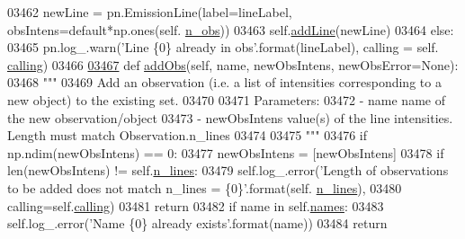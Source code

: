 \begin{DoxyCode}
{{{{{{{{{{{{{{{{{{{{{{03462             newLine = pn.EmissionLine(label=lineLabel, obsIntens=default*np.ones(self.
      \hyperlink{classpyneb_1_1core_1_1pynebcore_1_1_observation_aef2877f7f50f5c70cee1f0da97b34081}{n\_obs}))
03463             self.\hyperlink{classpyneb_1_1core_1_1pynebcore_1_1_observation_a5f4b01dbeb8d50963fb7fa21b94bfc17}{addLine}(newLine)
03464         \textcolor{keywordflow}{else}:
03465             pn.log\_.warn(\textcolor{stringliteral}{'Line \{0\} already in obs'}.format(lineLabel), calling = self.
      \hyperlink{classpyneb_1_1core_1_1pynebcore_1_1_observation_a2639fad9af4fefad20e4097295bd40e7}{calling})
03466 
\hypertarget{pynebcore_8py_source_l03467}{}\hyperlink{classpyneb_1_1core_1_1pynebcore_1_1_observation_a301e67ff50a467e97cd929039607a5d0}{03467}     \textcolor{keyword}{def }\hyperlink{classpyneb_1_1core_1_1pynebcore_1_1_observation_a301e67ff50a467e97cd929039607a5d0}{addObs}(self, name, newObsIntens, newObsError=None):
03468         \textcolor{stringliteral}{"""}
03469 \textcolor{stringliteral}{        Add an observation (i.e. a list of intensities corresponding to a new object) to the existing set.}
03470 \textcolor{stringliteral}{}
03471 \textcolor{stringliteral}{        Parameters:}
03472 \textcolor{stringliteral}{            - name            name of the new observation/object}
03473 \textcolor{stringliteral}{            - newObsIntens    value(s) of the line intensities. Length must match Observation.n\_lines}
03474 \textcolor{stringliteral}{                }
03475 \textcolor{stringliteral}{        """}
03476         \textcolor{keywordflow}{if} np.ndim(newObsIntens) == 0:
03477             newObsIntens = [newObsIntens]
03478         \textcolor{keywordflow}{if} len(newObsIntens) != self.\hyperlink{classpyneb_1_1core_1_1pynebcore_1_1_observation_ac61184d33006ae92f2a3ed42adc149be}{n\_lines}:
03479             self.log\_.error(\textcolor{stringliteral}{'Length of observations to be added does not match n\_lines = \{0\}'}.format(self.
      \hyperlink{classpyneb_1_1core_1_1pynebcore_1_1_observation_ac61184d33006ae92f2a3ed42adc149be}{n\_lines}),
03480                             calling=self.\hyperlink{classpyneb_1_1core_1_1pynebcore_1_1_observation_a2639fad9af4fefad20e4097295bd40e7}{calling})
03481             \textcolor{keywordflow}{return}
03482         \textcolor{keywordflow}{if} name \textcolor{keywordflow}{in} self.\hyperlink{classpyneb_1_1core_1_1pynebcore_1_1_observation_a3f365d0b1488b2eba300bf71caf23c17}{names}:
03483             self.log\_.error(\textcolor{stringliteral}{'Name \{0\} already exists'}.format(name))
03484             \textcolor{keywordflow}{return}
}}}}}}}}}}}}}}}}}}}}}}
\end{DoxyCode}
